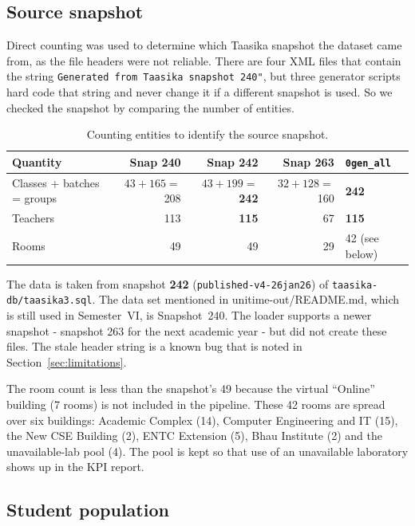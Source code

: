 \subsection{Source snapshot}

Direct counting was used to determine which Taasika snapshot the dataset came from, as the file headers were not reliable.
There are four XML files that contain the string \texttt{Generated from Taasika snapshot 240"}, but three generator scripts hard code that string and never change it if a different snapshot is used.
So we checked the snapshot by comparing the number of entities.

\begin{table}[H]
\centering
\caption{Counting entities to identify the source snapshot.}
\label{tab:snapshot}
\footnotesize
\begin{tabular}{@{}L{4.6cm}rrrl@{}}
\toprule
\textbf{Quantity} & \textbf{Snap 240} & \textbf{Snap 242} & \textbf{Snap 263} & \textbf{\texttt{0gen\_all}} \\
\midrule
Classes + batches = groups & $43{+}165={}$208 & $43{+}199={}$\textbf{242} & $32{+}128={}$160 & \textbf{242} \\
Teachers                   & 113 & \textbf{115} & 67 & \textbf{115} \\
Rooms                      & 49  & 49  & 29 & 42 (see below) \\
\bottomrule
\end{tabular}
\end{table}

The data is taken from snapshot \textbf{242} (\texttt{published-v4-26jan26}) of \texttt{taasika-db/taasika3.sql}.
The data set mentioned in unitime-out/README.md, which is still used in Semester~VI, is Snapshot~240.
The loader supports a newer snapshot - snapshot 263 for the next academic year - but did not create these files.
The stale header string is a known bug that is noted in Section~\ref{sec:limitations}.

The room count is less than the snapshot's 49 because the virtual ``Online'' building (7 rooms) is not included in the pipeline.
These 42 rooms are spread over six buildings: Academic Complex (14), Computer Engineering and IT (15), the New CSE Building (2), ENTC Extension (5), Bhau Institute (2) and the unavailable-lab pool (4). The pool is kept so that use of an unavailable laboratory shows up in the KPI report.

\subsection{Student population}

